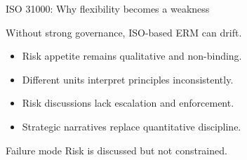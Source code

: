 \documentclass[aspectratio=169, 10pt]{beamer} %
\begin{document}
\begin{frame}{ISO 31000: Why flexibility becomes a weakness}

Without strong governance, ISO-based ERM can drift.

\medskip

\begin{itemize}
    \item Risk appetite remains qualitative and non-binding.
    
    \item Different units interpret principles inconsistently.
    
    \item Risk discussions lack escalation and enforcement.
    
    \item Strategic narratives replace quantitative discipline.
\end{itemize}

\begin{block}{Failure mode}
Risk is discussed but not constrained.
\end{block}

\end{frame}
\end{document}
